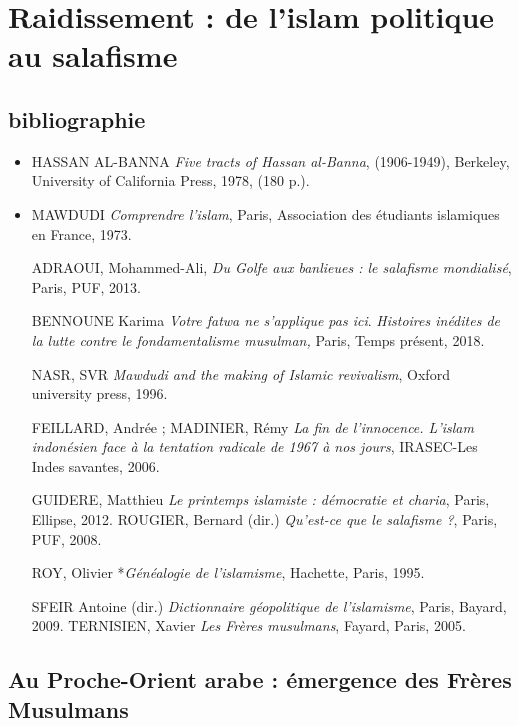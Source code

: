 
\chapter{{Raidissement : de l'islam politique au salafisme}}
 
 
 \section{bibliographie}
 
\begin{itemize}
\item

  HASSAN AL-BANNA \emph{Five tracts of Hassan al-Banna}, (1906-1949),
  Berkeley, University of California Press, 1978, (180 p.).

\item
  
  MAWDUDI \emph{Comprendre l'islam}, Paris, Association des étudiants
  islamiques en France, 1973.




ADRAOUI, Mohammed-Ali, \emph{Du Golfe aux banlieues : le salafisme
mondialisé}, Paris, PUF, 2013.

BENNOUNE Karima \emph{Votre fatwa ne s'applique pas ici}.
\emph{Histoires inédites de la lutte contre le fondamentalisme
musulman,} Paris, Temps présent, 2018.

NASR, SVR \emph{Mawdudi and the making of Islamic revivalism}, Oxford
university press, 1996.

FEILLARD, Andrée ; MADINIER, Rémy \emph{La fin de l'innocence. L'islam
indonésien face à la tentation radicale de 1967 à nos jours}, IRASEC-Les
Indes savantes, 2006.

GUIDERE, Matthieu \emph{Le printemps islamiste : démocratie et charia},
Paris, Ellipse, 2012. ROUGIER, Bernard (dir.) \emph{Qu'est-ce que le
salafisme ?}, Paris, PUF, 2008.

ROY, Olivier *\emph{Généalogie de l'islamisme}, Hachette, Paris, 1995.

SFEIR Antoine (dir.) \emph{Dictionnaire géopolitique de l'islamisme},
Paris, Bayard, 2009. TERNISIEN, Xavier \emph{Les Frères musulmans},
Fayard, Paris, 2005.
\end{itemize}



 
\section{{Au Proche-Orient arabe} :
  {émergence des Frères
  Musulmans}}

